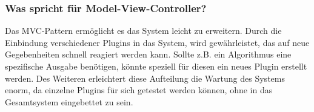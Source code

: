 \clearpage

\subsubsection{Was spricht für Model-View-Controller?}
Das MVC-Pattern ermöglicht es das System leicht zu erweitern. 
Durch die Einbindung verschiedener Plugins in das System, wird gewährleistet, das auf neue Gegebenheiten schnell reagiert werden kann.
Sollte z.B. ein Algorithmus eine spezifische Ausgabe benötigen, könnte speziell für diesen ein neues Plugin erstellt werden. 
Des Weiteren erleichtert diese Aufteilung die Wartung des Systems enorm, da einzelne Plugins für sich getestet werden können, ohne in das Gesamtsystem eingebettet zu sein. 

